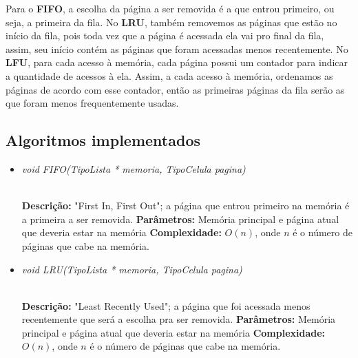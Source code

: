 \documentclass[12pt]{article}
\begin{document}
Para o \textbf{FIFO}, a escolha da página a ser removida é a que entrou primeiro, ou seja, a primeira da fila. No \textbf{LRU}, também removemos as páginas que estão no início da fila, pois toda vez que a página é acessada ela vai pro final da fila, assim, seu início contém as páginas que foram acessadas menos recentemente. No \textbf{LFU}, para cada acesso à memória, cada página possui um contador para indicar a quantidade de acessos à ela. Assim, a cada acesso à memória, ordenamos as páginas de acordo com esse contador, então as primeiras páginas da fila serão as que foram menos frequentemente usadas.


\subsection{Algoritmos implementados}

\vspace{0.2 true cm}

\begin{itemize}
 \item \begin{large}\textit{void FIFO(TipoLista * memoria, TipoCelula pagina)}\end{large}\\
 \subitem \textbf{Descrição:} "First In, First Out"; a página que entrou primeiro na memória é a primeira a ser removida.
 \subitem \textbf{Parâmetros:} Memória principal e página atual que deveria estar na memória
 \subitem \textbf{Complexidade:} $O(n)$, onde $n$ é o número de páginas que cabe na memória.
\end{itemize}

\vspace{0.2 true cm}

\begin{itemize}
 \item \begin{large}\textit{void LRU(TipoLista * memoria, TipoCelula pagina)}\end{large}\\
 \subitem \textbf{Descrição:} "Least Recently Used"; a página que foi acessada menos recentemente que será a escolha pra ser removida.
 \subitem \textbf{Parâmetros:} Memória principal e página atual que deveria estar na memória
 \subitem \textbf{Complexidade:} $O(n)$, onde $n$ é o número de páginas que cabe na memória.
\end{itemize}

\vspace{0.2 true cm}
\end{document}
